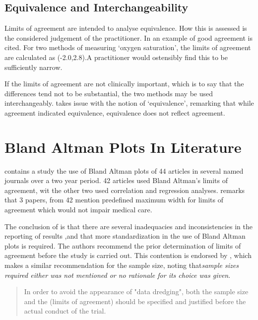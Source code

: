 \documentclass[12pt, a4paper]{report}
\theoremstyle{plain}
\theoremstyle{definition}
\theoremstyle{remark}
\begin{document}
	
	
	
	
	\subsection{Equivalence and Interchangeability}
	Limits of agreement are intended to analyse equivalence. How this
	is assessed is the considered judgement of the practitioner. In
	\citet{BA86} an example of good agreement is cited. For two
	methods of measuring `oxygen saturation', the limits of agreement
	are calculated as (-2.0,2.8).A practitioner would ostensibly find
	this to be sufficiently narrow.
	
	If the limits of agreement are not clinically important, which is
	to say that the differences tend not to be substantial, the two
	methods may be used interchangeably. \citet{DunnSEME} takes issue
	with the notion of `equivalence', remarking that while agreement
	indicated equivalence, equivalence does not reflect agreement.
	
	
	
	
	\section{Bland Altman Plots In Literature}
	\citet{mantha} contains a study the use of Bland Altman plots of
	44 articles in several named journals over a two year period. 42
	articles used Bland Altman's limits of agreement, wit the other
	two used correlation and regression analyses. \citet{mantha}
	remarks that 3 papers, from 42 mention predefined maximum width
	for limits of agreement which would not impair medical care.
	
	The conclusion of \citet{mantha} is that there are several
	inadequacies and inconsistencies in the reporting of results ,and
	that more standardization in the use of Bland Altman plots is
	required. The authors recommend the prior determination of limits
	of agreement before the study is carried out. This contention is
	endorsed by \citet{lin}, which makes a similar recommendation for
	the sample size, noting that\emph{sample sizes required either was
		not mentioned or no rationale for its choice was given}.
	
	\begin{quote}
		In order to avoid the appearance of "data dredging", both the
		sample size and the (limits of agreement) should be specified and
		justified before the actual conduct of the trial. \citep{lin}
	\end{quote}
	
\end{document}
